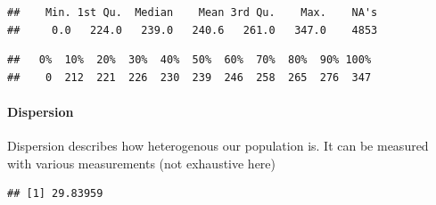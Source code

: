 \documentclass[
]{book}
\newenvironment{Shaded}{\begin{snugshade}}{\end{snugshade}}
\newcommand{\CommentTok}[1]{\textcolor[rgb]{0.56,0.35,0.01}{\textit{#1}}}
\newcommand{\DataTypeTok}[1]{\textcolor[rgb]{0.13,0.29,0.53}{#1}}
\newcommand{\DecValTok}[1]{\textcolor[rgb]{0.00,0.00,0.81}{#1}}
\newcommand{\KeywordTok}[1]{\textcolor[rgb]{0.13,0.29,0.53}{\textbf{#1}}}
\newcommand{\NormalTok}[1]{#1}
\newcommand{\OperatorTok}[1]{\textcolor[rgb]{0.81,0.36,0.00}{\textbf{#1}}}
\begin{document}
\begin{Shaded}
\end{Shaded}

\begin{verbatim}
##    Min. 1st Qu.  Median    Mean 3rd Qu.    Max.    NA's 
##     0.0   224.0   239.0   240.6   261.0   347.0    4853
\end{verbatim}

\begin{Shaded}
\end{Shaded}

\begin{verbatim}
##   0%  10%  20%  30%  40%  50%  60%  70%  80%  90% 100% 
##    0  212  221  226  230  239  246  258  265  276  347
\end{verbatim}

\hypertarget{dispersion}{%
\paragraph{Dispersion}\label{dispersion}}

Dispersion describes how heterogenous our population is. It can be measured with various measurements (not exhaustive here)

\begin{Shaded}
\end{Shaded}

\begin{verbatim}
## [1] 29.83959
\end{verbatim}

\begin{Shaded}
\end{Shaded}
\end{document}
